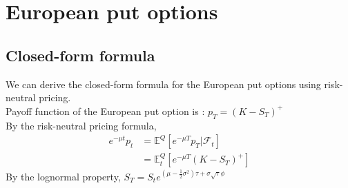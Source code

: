\section{European put options}

\subsection{Closed-form formula}
We can derive the closed-form formula for the European put options using risk-neutral pricing.\\
Payoff function of the European put option is : $p_{T} = (K - S_{T})^{+}$\\
By the risk-neutral pricing formula,
\begin{equation}
\begin{split}
e^{-\mu t}p_{t}
&= \mathbb{E}^{Q}[e^{-\mu T}p_{T} | \mathcal{F}_{t}]\\
&= \mathbb{E}_{t}^{Q}[e^{-\mu T}(K - S_{T})^{+}]
\end{split}
\end{equation}
By the lognormal property, \quad
$S_{T} = S_{t}e^{(\mu - \frac{1}{2}\sigma^{2})\tau + \sigma\sqrt{\tau}\phi}$
